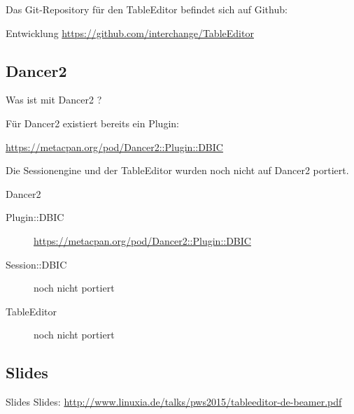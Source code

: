 Das Git-Repository für den TableEditor befindet sich auf Github:

\begin{frame}{Entwicklung}
\url{https://github.com/interchange/TableEditor}
\end{frame}

\subsection{Dancer2}

Was ist mit Dancer2 ?

Für Dancer2 existiert bereits ein Plugin:

\url{https://metacpan.org/pod/Dancer2::Plugin::DBIC}

Die Sessionengine und der TableEditor wurden noch nicht auf Dancer2 portiert.

\begin{frame}{Dancer2}
  \begin{description}
  \item[Plugin::DBIC] \url{https://metacpan.org/pod/Dancer2::Plugin::DBIC}
  \item[Session::DBIC] noch nicht portiert
  \item[TableEditor] noch nicht portiert
  \end{description}
\end{frame}


\subsection{Slides}

\begin{frame}{Slides}
Slides:
\url{http://www.linuxia.de/talks/pws2015/tableeditor-de-beamer.pdf}
\end{frame}



